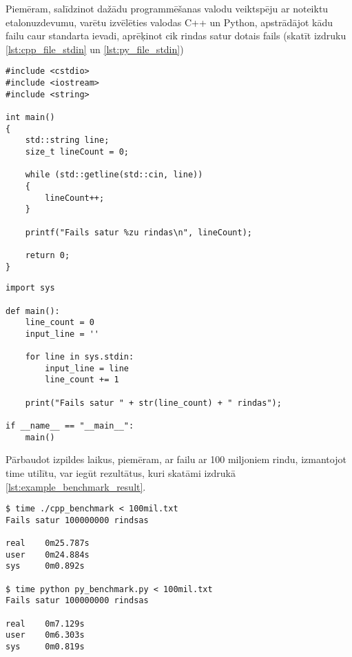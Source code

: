 \documentclass[12pt]{report}%
\theoremstyle{definition}
\begin{document}
Piemēram, salīdzinot dažādu programmēšanas valodu veiktspēju ar noteiktu etalonuzdevumu, varētu izvēlēties valodas C++ un Python,
apstrādājot kādu failu caur standarta ievadi, aprēķinot cik rindas satur dotais fails (skatīt izdruku \ref{lst:cpp_file_stdin} un \ref{lst:py_file_stdin})


\begin{lstlisting}[caption={Vienkārša faila apstrāde valodā C++ caur standarta ievadi},
  label=lst:cpp_file_stdin,
  captionpos=t
]
#include <cstdio>
#include <iostream>
#include <string>

int main()
{
	std::string line;
	size_t lineCount = 0;

	while (std::getline(std::cin, line))
	{
		lineCount++;
	}

	printf("Fails satur %zu rindas\n", lineCount);

	return 0;
}
\end{lstlisting}


\begin{lstlisting}[caption={Vienkārša faila apstrāde valodā Python caur standarta ievadi},
  label=lst:py_file_stdin,
  captionpos=t
]
import sys 

def main():
    line_count = 0
    input_line = ''

    for line in sys.stdin:
        input_line = line
        line_count += 1

    print("Fails satur " + str(line_count) + " rindas");

if __name__ == "__main__":
    main()
\end{lstlisting}

Pārbaudot izpildes laikus, piemēram, ar failu ar 100 miljoniem rindu, izmantojot time utilītu, var iegūt rezultātus, kuri skatāmi izdrukā \ref{lst:example_benchmark_result}.

\begin{lstlisting}[caption={Etalonuzdevuma rezultāti failam ar 100 miljoniem rindu},
  label=lst:example_benchmark_result,
  captionpos=t
]
$ time ./cpp_benchmark < 100mil.txt 
Fails satur 100000000 rindsas

real    0m25.787s
user    0m24.884s
sys     0m0.892s

$ time python py_benchmark.py < 100mil.txt 
Fails satur 100000000 rindsas

real    0m7.129s
user    0m6.303s
sys     0m0.819s
\end{lstlisting}
\end{document}
